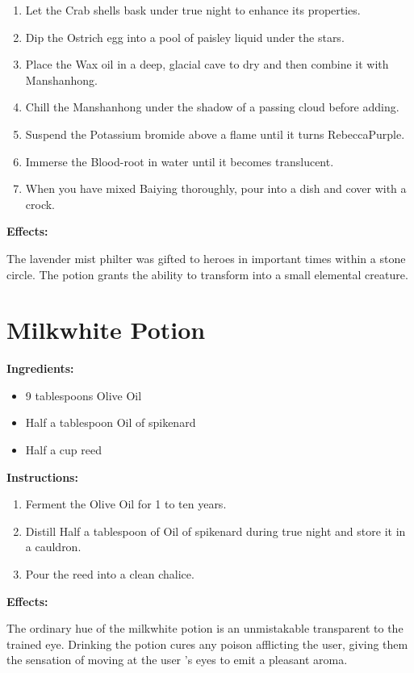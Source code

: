 \documentclass{article}
\begin{document}
\begin{enumerate}
  \item Let the Crab shells bask under true night to enhance its properties.
  \item Dip the Ostrich egg into a pool of paisley liquid under the stars.
  \item Place the Wax oil in a deep, glacial cave to dry and then combine it with Manshanhong.
  \item Chill the Manshanhong under the shadow of a passing cloud before adding.
  \item Suspend the Potassium bromide above a flame until it turns RebeccaPurple.
  \item Immerse the Blood-root in water until it becomes translucent.
  \item When you have mixed Baiying thoroughly, pour into a dish and cover with a crock.
\end{enumerate}

\textbf{Effects:}

The lavender mist philter was gifted to heroes in important times within a stone circle. The potion grants the ability to transform into a small elemental creature.

\newpage
\section*{Milkwhite Potion}

\textbf{Ingredients:}

\begin{itemize}
  \item 9 tablespoons Olive Oil
  \item Half a tablespoon Oil of spikenard
  \item Half a cup reed
\end{itemize}

\textbf{Instructions:}

\begin{enumerate}
  \item Ferment the Olive Oil for 1 to ten years.
  \item Distill Half a tablespoon of Oil of spikenard during true night and store it in a cauldron.
  \item Pour the reed into a clean chalice.
\end{enumerate}

\textbf{Effects:}

The ordinary hue of the milkwhite potion is an unmistakable transparent to the trained eye. Drinking the potion cures any poison afflicting the user, giving them the sensation of moving at the user 's eyes to emit a pleasant aroma.
\end{document}
